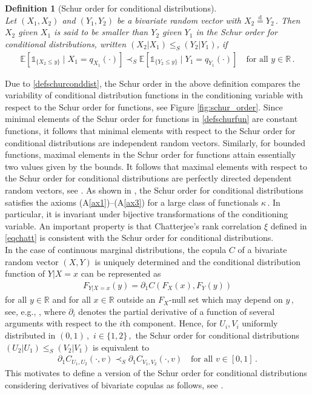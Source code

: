 \documentclass{article}
\newtheorem{definition}[theorem]{Definition}
\def\1{\mathds{1}} %
\newcommand{\eqd}{\stackrel{\mathrm{d}}=}
\newcommand{\E}{\mathbb{E}}
\newcommand{\R}{\mathbb{R}}
\begin{document}
\begin{definition}[Schur order for conditional distributions]~\\
    Let \((X_1,X_2)\) and \((Y_1,Y_2)\) be a bivariate random vector with \(X_2\eqd Y_2\,.\)
    Then \(X_2\) given \(X_1\) is said to be smaller than \(Y_2\) given \(Y_1\) in the \emph{Schur order for conditional distributions}, written \((X_2|X_1)\leq_S (Y_2|Y_1)\), if
    \begin{align}\label{defschurconddist}
        \E[\1_{\{X_2\leq y\}}\mid X_1 = q_{X_1}(\cdot)] \prec_S \E[\1_{\{Y_2\leq y\}}\mid Y_1 = q_{Y_1}(\cdot)] \quad \text{for all }y\in \R\,.
    \end{align}
\end{definition} 
Due to \eqref{defschurconddist}, the Schur order in the above definition compares the variability of conditional distribution functions in the conditioning variable with respect to the Schur order for functions, see Figure \ref{fig:schur_order}.
Since minimal elements of the Schur order for functions in \eqref{defschurfun} are constant functions, it follows that minimal elements with respect to the Schur order for conditional distributions are independent random vectors.
Similarly, for bounded functions, maximal elements in the Schur order for functions attain essentially two values given by the bounds.
It follows that maximal elements with respect to the Schur order for conditional distributions are perfectly directed dependent random vectors, see \cite[Theorem 3.5]{Ansari-Fuchs-2022}.
As shown in \cite{Ansari-Fuchs-2023}, the Schur order for conditional distributions satisfies the axioms (A\ref{ax1})--(A\ref{ax3}) for a large class of functionals \(\kappa\,.\)
In particular, it is invariant under bijective transformations of the conditioning variable.
An important property is that Chatterjee's rank correlation \(\xi\) defined in \eqref{eqchatt} is consistent with the Schur order for conditional distributions. \\
In the case of continuous marginal distributions, the copula \(C\) of a bivariate random vector \((X,Y)\) is uniquely determined and the conditional distribution function of \(Y|X=x\) can be represented as
\begin{align}\label{eqsklarcondcdf}
    F_{Y|X=x}(y) = \partial_1 C(F_X(x),F_Y(y))
\end{align}
for all \(y\in \R\) and for all \(x\in \R\) outside an \(F_X\)-null set which may depend on \(y\,,\) see, e.g., \cite[Theorem 2.2]{Ansari-Rueschendorf-2021}, where \(\partial_i\) denotes the partial derivative of a function of several arguments with respect to the \(i\)th component.
Hence, for \(U_i,V_i\) uniformly distributed in \((0,1)\,,\) \(i\in \{1,2\}\,,\) the Schur order for conditional distributions \((U_2|U_1)\leq_S (V_2|V_1)\) is equivalent to
\begin{align*}
    \partial_1 C_{U_1,U_2}(\cdot,v) \prec_S \partial_1 C_{V_1,V_2}(\cdot,v) \quad \text{for all } v\in [0,1]\,.
\end{align*}
This motivates to define a version of the Schur order for conditional distributions considering derivatives of bivariate copulas as follows, see \cite{Ansari-2019,Ansari-Rueschendorf-2021,strothmann2022rearranged}.
\end{document}
